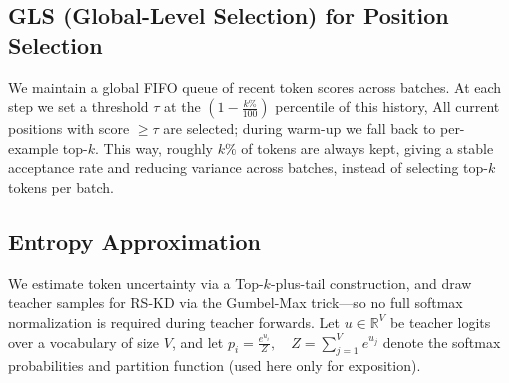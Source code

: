 \documentclass[11pt]{article}
\begin{document}
\subsection{GLS (Global-Level Selection) for Position Selection}
We maintain a global FIFO queue of recent token scores across batches.
At each step we set a threshold $\tau$ at the $(1-\tfrac{k\%}{100})$ percentile of this history,
All current positions with score $\ge\tau$ are selected; during warm-up we fall back to per-example top-$k$.
This way, roughly $k\%$ of tokens are always kept, giving a stable acceptance rate and reducing variance across batches, instead of selecting top-$k$ tokens per batch.

\subsection{Entropy Approximation}
\label{sec:entropy}
We estimate token uncertainty via a Top-$k$-plus-tail construction, and draw teacher samples for RS-KD via the Gumbel-Max trick---so no full softmax normalization is required during teacher forwards.
Let $u \in \mathbb{R}^V$ be teacher logits over a vocabulary of size $V$, and let
$
	p_i=\frac{e^{u_i}}{Z},\quad Z=\sum_{j=1}^V e^{u_j}
$
denote the softmax probabilities and partition function (used here only for exposition).
\end{document}
